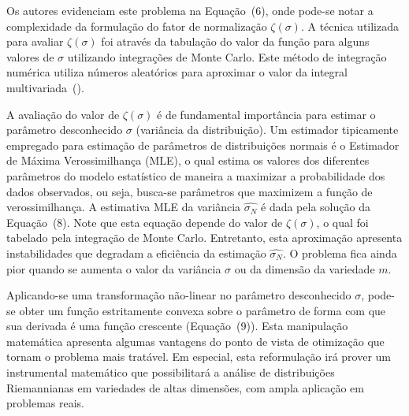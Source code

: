\documentclass[a4paper,titlepage]{article}
\begin{document}
Os autores evidenciam este problema na Equação~(6), onde pode-se notar
a complexidade da formulação do fator de normalização $\zeta(\sigma)$. A
técnica utilizada para avaliar $\zeta(\sigma)$ foi através da tabulação do
valor da função para alguns valores de $\sigma$ utilizando integrações de Monte
Carlo.  Este método de integração numérica utiliza números aleatórios para
aproximar o valor da integral multivariada~(\cite{caflisch1998monte}).

A avaliação do valor de $\zeta(\sigma)$ é de fundamental importância para
estimar o parâmetro desconhecido $\sigma$ (variância da distribuição).
 Um estimador tipicamente empregado para estimação de parâmetros
de distribuições normais é o Estimador de Máxima Verossimilhança (MLE), o qual
estima os valores dos diferentes parâmetros do modelo estatístico de maneira a
maximizar a probabilidade dos dados observados, ou seja, busca-se parâmetros
que maximizem a função de verossimilhança. A estimativa MLE da variância
$\hat{\sigma_N}$ é dada pela solução da Equação~(8). Note que esta equação
depende do valor de $\zeta(\sigma)$, o qual foi tabelado pela integração de
Monte Carlo. Entretanto, esta aproximação apresenta instabilidades que degradam
a eficiência da estimação $\hat{\sigma_N}$. O problema fica ainda pior quando
se aumenta o valor da variância $\sigma$ ou da dimensão da variedade $m$.  

\begin{center}
  \vspace{1em}
  \vspace{1em}
\end{center}

Aplicando-se uma transformação não-linear no parâmetro desconhecido $\sigma$,
pode-se obter um função estritamente convexa sobre o parâmetro de forma com que
sua derivada é uma função crescente (Equação~(9)). Esta manipulação matemática
apresenta algumas vantagens do ponto de vista de otimização que tornam o
problema mais tratável. Em especial, esta reformulação irá prover um
instrumental matemático que possibilitará a análise de distribuições
Riemannianas em variedades de altas dimensões, com ampla aplicação em problemas
reais.
\end{document}
